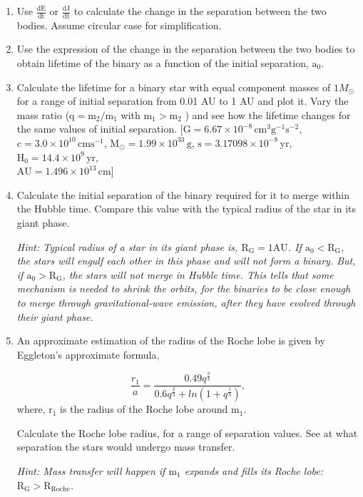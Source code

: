 \documentclass{article} %
\begin{document}
     \begin{enumerate}
     \item Use $\mathrm{\frac{dE}{dt}}$ or $\mathrm{\frac{dJ}{dt}}$ to calculate the change in the separation between the two bodies. Assume circular case for simplification.
     \item Use the expression of the change in the separation between the two bodies to obtain lifetime of the binary as a function of the initial separation, $\mathrm{a_0}$.
     \item Calculate the lifetime for a binary star with equal component masses of $1 M_{\odot}$ for a range of initial separation from 0.01 AU to 1 AU and plot it. Vary the mass ratio ($\mathrm{q=m_2/m_1}$ with $\mathrm{m_1 > m_2}$ ) and see how the lifetime changes for the same values of initial separation.
    [$\mathrm{G = 6.67\times10^{-8}\,cm^3g^{-1}s^{-2}}$, $\mathrm{c = 3.0\times10^10\,cm s^{-1}}$,
    $\mathrm{M_{\odot} = 1.99\times10^33\,g}$, $\mathrm{s = 3.17098\times10^{-8}\,yr}$, 
    $\mathrm{H_0 = 14.4\times10^9\,yr}$, \\
    $\mathrm{AU = 1.496\times10^13\,cm}$]
    
    \item Calculate the initial separation of the binary required for it to merge within the Hubble time. Compare this value with the typical radius of the star in its giant phase.
    
    \textit{Hint: Typical radius of a star in its giant phase is, $\mathrm{R_G = 1 AU}$. If $\mathrm{a_0 < R_G}$, the stars will engulf each other in this phase and will not form a binary. But, if $\mathrm{a_0 > R_G}$, the stars will not merge in Hubble time. This tells that some mechanism is needed to shrink the orbits, for the binaries to be close enough to merge through gravitational-wave emission, after they have evolved through their giant phase.}
    
    \item An approximate estimation of the radius of the Roche lobe is given by Eggleton’s approximate formula,
    
    \begin{equation}
    \frac{r_1}{a} = \frac{0.49 q^{\frac{2}{3}}}{0.6 q^{\frac{2}{3}}+ ln(1+q^{\frac{1}{3}})},
    \end{equation}
    where, $\mathrm{r_1}$ is the radius of the Roche lobe around $\mathrm{m_1}$.
    
    Calculate the Roche lobe radius, for a range of separation values. See at what separation the stars would undergo mass transfer.
    
    \textit{Hint: Mass transfer will happen if $\mathrm{m_1}$ expands and fills its Roche lobe: $\mathrm{R_G>R_{Roche}}$.}
    
    \end{enumerate}
    
\end{document}
